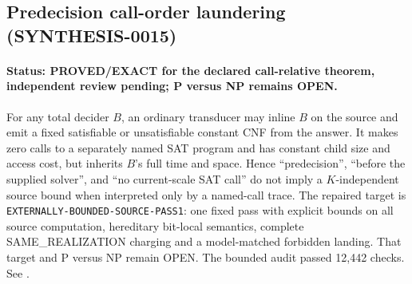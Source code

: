 \subsection{Predecision call-order laundering (SYNTHESIS-0015)}
\paragraph{Status: PROVED/EXACT for the declared call-relative theorem,
independent review pending; P versus NP remains OPEN.}
For any total decider $B$, an ordinary transducer may inline $B$ on the source
and emit a fixed satisfiable or unsatisfiable constant CNF from the answer.
It makes zero calls to a separately named SAT program and has constant child
size and access cost, but inherits $B$'s full time and space.  Hence
``predecision'', ``before the supplied solver'', and ``no current-scale SAT
call'' do not imply a $K$-independent source bound when interpreted only by a
named-call trace.  The repaired target is
\texttt{EXTERNALLY-BOUNDED-SOURCE-PASS1}: one fixed pass with explicit bounds
on all source computation, hereditary bit-local semantics, complete
SAME\_REALIZATION charging and a model-matched forbidden landing.  That target
and P versus NP remain OPEN.  The bounded audit passed 12,442 checks.  See
.
